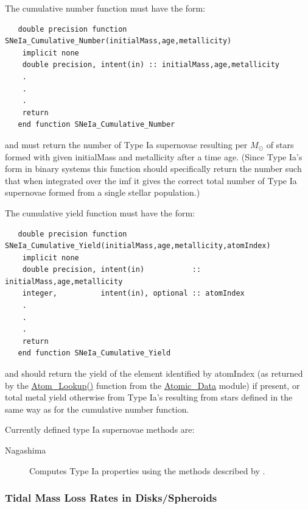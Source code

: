 The cumulative number function must have the form:
\begin{verbatim}
   double precision function SNeIa_Cumulative_Number(initialMass,age,metallicity)
    implicit none
    double precision, intent(in) :: initialMass,age,metallicity
    .
    .
    .
    return
   end function SNeIa_Cumulative_Number 
\end{verbatim}
and must return the number of Type Ia supernovae resulting per $M_\odot$ of stars formed with given {\normalfont \ttfamily initialMass} and {\normalfont \ttfamily metallicity} after a time {\normalfont \ttfamily age}. (Since Type Ia's form in binary systems this function should specifically return the number such that when integrated over the \gls{imf} it gives the correct total number of Type Ia supernovae formed from a single stellar population.)

The cumulative yield function must have the form:
\begin{verbatim}
   double precision function SNeIa_Cumulative_Yield(initialMass,age,metallicity,atomIndex)
    implicit none
    double precision, intent(in)           :: initialMass,age,metallicity
    integer,          intent(in), optional :: atomIndex
    .
    .
    .
    return
   end function SNeIa_Cumulative_Yield 
\end{verbatim}
and should return the yield of the element identified by {\normalfont \ttfamily atomIndex} (as returned by the \hyperlink{atomic.data.F90:atomic_data:atom_lookup}{{\normalfont \ttfamily Atom\_Lookup()}} function from the \hyperlink{atomic.data.F90:atomic_data}{{\normalfont \ttfamily Atomic\_Data}} module) if present, or total metal yield otherwise from Type Ia's resulting from stars defined in the same way as for the cumulative number function.

Currently defined type Ia supernovae methods are:
\begin{description}
 \item [{\normalfont \ttfamily Nagashima}] Computes Type Ia properties using the methods described by \cite{nagashima_metal_2005}.
\end{description}

\subsubsection{Tidal Mass Loss Rates in Disks/Spheroids}

